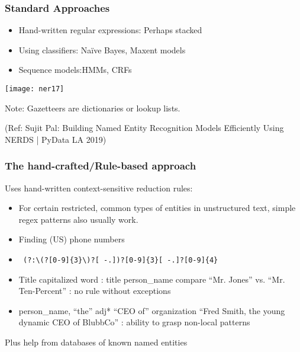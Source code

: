 \begin{frame}[fragile]\frametitle{Standard Approaches}
  \begin{itemize}
  \item Hand-written regular expressions:  Perhaps stacked
  \item Using classifiers: Naïve Bayes, Maxent models
  \item Sequence models:HMMs, CRFs
  \end{itemize}
	
\begin{center}
\texttt{[image: ner17]}
\end{center}

Note: Gazetteers are dictionaries or lookup lists.

{\tiny (Ref: Sujit Pal: Building Named Entity Recognition Models Efficiently Using NERDS | PyData LA 2019)}
	
\end{frame}

\begin{frame}[fragile]\frametitle{The hand-crafted/Rule-based approach}
Uses hand-written context-sensitive reduction rules:
  \begin{itemize}
  \item For certain restricted, common types of entities in unstructured 
text, simple regex patterns also usually work.
  \item Finding (US) phone numbers
  \item \lstinline| (?:\(?[0-9]{3}\)?[ -.])?[0-9]{3}[ -.]?[0-9]{4}|
  \item Title capitalized word : title person\_name compare ``Mr. Jones'' vs. ``Mr. Ten-Percent'' : no rule without exceptions
  \item  person\_name, ``the'' adj* ``CEO of'' organization ``Fred Smith, the young dynamic CEO of BlubbCo'' : ability to grasp non-local patterns
  \end{itemize}
  Plus help from databases of known named entities

\end{frame}


